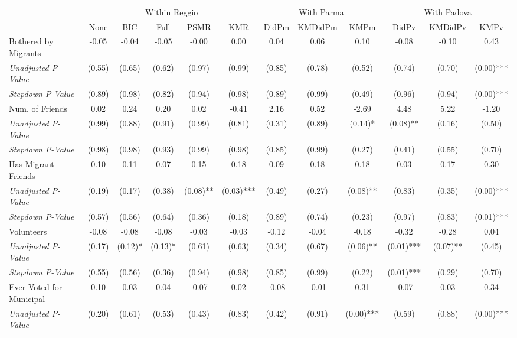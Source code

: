 \begin{tabular}{l c c c c c c c c c c c}
\toprule
& \multicolumn{5}{c}{Within Reggio} & \multicolumn{3}{c}{With Parma} & \multicolumn{3}{c}{With Padova} \\\cmidrule(lr){2-6} \cmidrule(lr){7-9} \cmidrule(lr){10-12}
 & None & BIC & Full & PSMR & KMR & DidPm & KMDidPm & KMPm & DidPv & KMDidPv & KMPv \\
\midrule
Bothered by Migrants & -0.05 & -0.04 & -0.05 & -0.00 & 0.00 & 0.04 & 0.06 & 0.10 & -0.08 & -0.10 & 0.43 \\
\quad \textit{Unadjusted P-Value} & (0.55) & (0.65) & (0.62) & (0.97) & (0.99) & (0.85) & (0.78) & (0.52) & (0.74) & (0.70) & (0.00)*** \\
\quad \textit{Stepdown P-Value} & (0.89) & (0.98) & (0.82) & (0.94) & (0.98) & (0.89) & (0.99) & (0.49) & (0.96) & (0.94) & (0.00)*** \\
Num. of Friends & 0.02 & 0.24 & 0.20 & 0.02 & -0.41 & 2.16 & 0.52 & -2.69 & 4.48 & 5.22 & -1.20 \\
\quad \textit{Unadjusted P-Value} & (0.99) & (0.88) & (0.91) & (0.99) & (0.81) & (0.31) & (0.89) & (0.14)* & (0.08)** & (0.16) & (0.50) \\
\quad \textit{Stepdown P-Value} & (0.98) & (0.98) & (0.93) & (0.99) & (0.98) & (0.85) & (0.99) & (0.27) & (0.41) & (0.55) & (0.70) \\
Has Migrant Friends & 0.10 & 0.11 & 0.07 & 0.15 & 0.18 & 0.09 & 0.18 & 0.18 & 0.03 & 0.17 & 0.30 \\
\quad \textit{Unadjusted P-Value} & (0.19) & (0.17) & (0.38) & (0.08)** & (0.03)*** & (0.49) & (0.27) & (0.08)** & (0.83) & (0.35) & (0.00)*** \\
\quad \textit{Stepdown P-Value} & (0.57) & (0.56) & (0.64) & (0.36) & (0.18) & (0.89) & (0.74) & (0.23) & (0.97) & (0.83) & (0.01)*** \\
Volunteers & -0.08 & -0.08 & -0.08 & -0.03 & -0.03 & -0.12 & -0.04 & -0.18 & -0.32 & -0.28 & 0.04 \\
\quad \textit{Unadjusted P-Value} & (0.17) & (0.12)* & (0.13)* & (0.61) & (0.63) & (0.34) & (0.67) & (0.06)** & (0.01)*** & (0.07)** & (0.45) \\
\quad \textit{Stepdown P-Value} & (0.55) & (0.56) & (0.36) & (0.94) & (0.98) & (0.85) & (0.99) & (0.22) & (0.01)*** & (0.29) & (0.70) \\
Ever Voted for Municipal & 0.10 & 0.03 & 0.04 & -0.07 & 0.02 & -0.08 & -0.01 & 0.31 & -0.07 & 0.03 & 0.34 \\
\quad \textit{Unadjusted P-Value} & (0.20) & (0.61) & (0.53) & (0.43) & (0.83) & (0.42) & (0.91) & (0.00)*** & (0.59) & (0.88) & (0.00)*** \\

\end{tabular}
